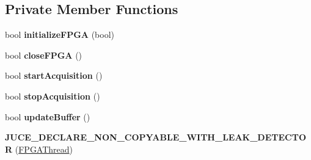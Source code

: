 \subsection*{Private Member Functions}
\begin{DoxyCompactItemize}
\item 
\hypertarget{classFPGAThread_ae60d0b8a8d6ce978040f9c0a0a613399}{bool {\bfseries initialize\-F\-P\-G\-A} (bool)}\label{classFPGAThread_ae60d0b8a8d6ce978040f9c0a0a613399}

\item 
\hypertarget{classFPGAThread_a26a37cd26819b8bf884d9607df7078e0}{bool {\bfseries close\-F\-P\-G\-A} ()}\label{classFPGAThread_a26a37cd26819b8bf884d9607df7078e0}

\item 
\hypertarget{classFPGAThread_a0b23746128abec94e4ed5ef1f7e6e115}{bool {\bfseries start\-Acquisition} ()}\label{classFPGAThread_a0b23746128abec94e4ed5ef1f7e6e115}

\item 
\hypertarget{classFPGAThread_a38a4c39dfbd30ef38bbcee3be29ebb65}{bool {\bfseries stop\-Acquisition} ()}\label{classFPGAThread_a38a4c39dfbd30ef38bbcee3be29ebb65}

\item 
\hypertarget{classFPGAThread_a2d4ea188b4d9f1f77affd5cc95debc5a}{bool {\bfseries update\-Buffer} ()}\label{classFPGAThread_a2d4ea188b4d9f1f77affd5cc95debc5a}

\item 
\hypertarget{classFPGAThread_aef8282fed618e89f9e5cd2c98bf28cb6}{{\bfseries J\-U\-C\-E\-\_\-\-D\-E\-C\-L\-A\-R\-E\-\_\-\-N\-O\-N\-\_\-\-C\-O\-P\-Y\-A\-B\-L\-E\-\_\-\-W\-I\-T\-H\-\_\-\-L\-E\-A\-K\-\_\-\-D\-E\-T\-E\-C\-T\-O\-R} (\hyperlink{classFPGAThread}{F\-P\-G\-A\-Thread})}\label{classFPGAThread_aef8282fed618e89f9e5cd2c98bf28cb6}

\end{DoxyCompactItemize}
